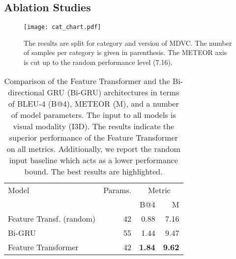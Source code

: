 \documentclass[10pt,twocolumn,letterpaper]{article}
\begin{document}
\subsection{Ablation Studies}

\begin{figure}[t]
\begin{center}
\texttt{[image: cat\_chart.pdf]}
\end{center}
\vspace{-1em}
   \caption{The results are split for category and version of MDVC. The number of samples per category is given in parenthesis. The METEOR axis is cut up to the random performance level (7.16).\label{fig:cat_chart2}}
\end{figure}

\begin{table}[t]
\centering
\begin{tabular}{lrrr}
\toprule
Model					  &Params.	& \multicolumn{2}{c}{Metric} \\
						&  &B@4		&M \\  \midrule \midrule
Feature Transf. (random)&		42		&0.88	&7.16 \\
Bi-GRU					&		55		&1.44	&9.47 \\
Feature Transformer				&		42		&\textbf{1.84}	&\textbf{9.62} \\
\toprule
\end{tabular}
\vspace{0.5ex}
\caption{
 Comparison of the Feature Transformer and the Bi-directional GRU (Bi-GRU) architectures in terms of BLEU-4 (B@4), METEOR (M), and a number of model parameters. The input to all models is visual modality (I3D). The results indicate the superior performance of the Feature Transformer on all metrics. Additionally, we report the random input baseline which acts as a lower performance bound. The best results are highlighted.\label{table:ablation1}
}
\end{table}
\end{document}
